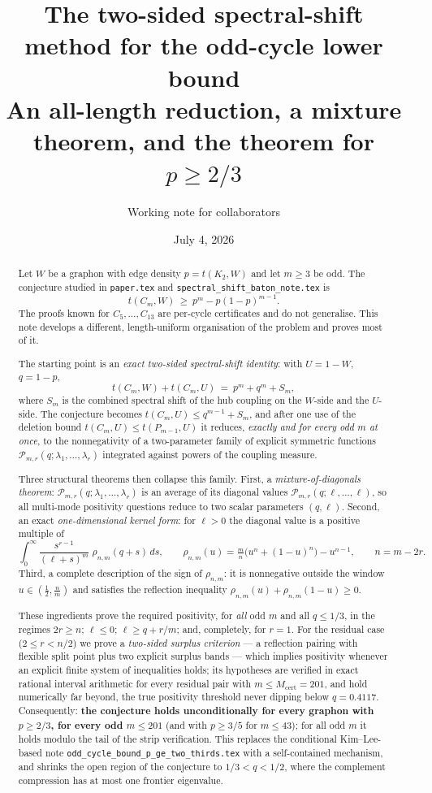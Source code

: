\documentclass[11pt]{article}
\title{The two-sided spectral-shift method for the odd-cycle lower bound\\
\large An all-length reduction, a mixture theorem, and the theorem for $p\ge 2/3$}
\author{Working note for collaborators}
\date{July 4, 2026}
\newcommand{\Pcal}{\mathcal P}
\newcommand{\MCERT}{201}
\begin{document}
\maketitle

\begin{abstract}
Let $W$ be a graphon with edge density $p=t(K_2,W)$ and let $m\ge3$ be odd.  The conjecture studied in \texttt{paper.tex} and \texttt{spectral\_shift\_baton\_note.tex} is
\[
        t(C_m,W)\ \ge\ p^m-p(1-p)^{m-1}.
\]
The proofs known for $C_5,\dots,C_{13}$ are per-cycle certificates and do not generalise.  This note develops a different, length-uniform organisation of the problem and proves most of it.

The starting point is an \emph{exact two-sided spectral-shift identity}: with $U=1-W$, $q=1-p$,
\[
        t(C_m,W)+t(C_m,U)\ =\ p^m+q^m+S_m,
\]
where $S_m$ is the combined spectral shift of the hub coupling on the $W$-side and the $U$-side.  The conjecture becomes $t(C_m,U)\le q^{m-1}+S_m$, and after one use of the deletion bound $t(C_m,U)\le t(P_{m-1},U)$ it reduces, \emph{exactly and for every odd $m$ at once}, to the nonnegativity of a two-parameter family of explicit symmetric functions $\Pcal_{m,r}(q;\lambda_1,\dots,\lambda_r)$ integrated against powers of the coupling measure.

Three structural theorems then collapse this family.  First, a \emph{mixture-of-diagonals theorem}: $\Pcal_{m,r}(q;\lambda_1,\dots,\lambda_r)$ is an average of its diagonal values $\Pcal_{m,r}(q;\ell,\dots,\ell)$, so all multi-mode positivity questions reduce to two scalar parameters $(q,\ell)$.  Second, an exact \emph{one-dimensional kernel form}: for $\ell>0$ the diagonal value is a positive multiple of
\[
        \int_0^\infty \frac{s^{r-1}}{(\ell+s)^{m}}\;\rho_{n,m}(q+s)\,ds,
        \qquad
        \rho_{n,m}(u)=\tfrac mn\bigl(u^n+(1-u)^n\bigr)-u^{n-1},
        \qquad n=m-2r .
\]
Third, a complete description of the sign of $\rho_{n,m}$: it is nonnegative outside the window $u\in(\tfrac12,\tfrac nm)$ and satisfies the reflection inequality $\rho_{n,m}(u)+\rho_{n,m}(1-u)\ge0$.

These ingredients prove the required positivity, for \emph{all} odd $m$ and all $q\le 1/3$, in the regimes $2r\ge n$; $\ell\le0$; $\ell\ge q+r/m$; and, completely, for $r=1$.  For the residual case ($2\le r<n/2$) we prove a \emph{two-sided surplus criterion} --- a reflection pairing with flexible split point plus two explicit surplus bands --- which implies positivity whenever an explicit finite system of inequalities holds; its hypotheses are verified in exact rational interval arithmetic for every residual pair with $m\le M_{\mathrm{cert}}=\MCERT$, and hold numerically far beyond, the true positivity threshold never dipping below $q=0.4117$.  Consequently: \textbf{the conjecture holds unconditionally for every graphon with $p\ge2/3$, for every odd $m\le\MCERT$} (and with $p\ge3/5$ for $m\le43$); for all odd $m$ it holds modulo the tail of the strip verification.  This replaces the conditional Kim--Lee-based note \texttt{odd\_cycle\_bound\_p\_ge\_two\_thirds.tex} with a self-contained mechanism, and shrinks the open region of the conjecture to $1/3<q<1/2$, where the complement compression has at most one frontier eigenvalue.


\end{abstract}
\end{document}
